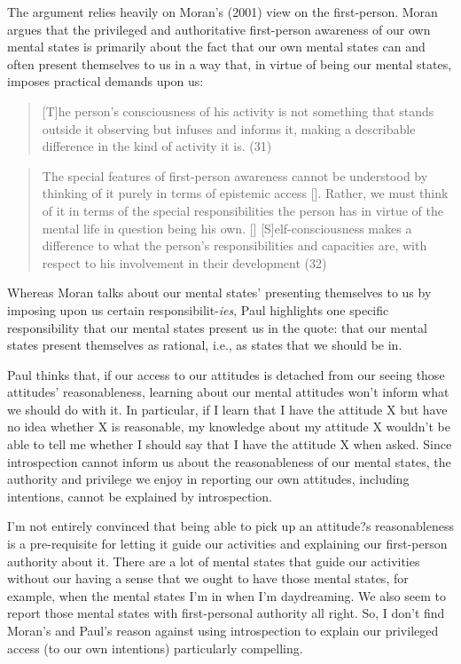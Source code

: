 \documentclass[a4paper,12pt]{article}
\begin{document}
The argument relies heavily on Moran's (2001) view on the first-person. Moran argues that the privileged and authoritative first-person awareness of our own mental states is primarily about the fact that our own mental states can and often present themselves to us in a way that, in virtue of being our mental states, imposes practical demands upon us:

\begin{quote} [T]he person's consciousness of his activity is not something that stands outside it observing but infuses and informs it, making a describable difference in the kind of activity it is. (31) \end{quote}

\begin{quote} The special features of first-person awareness cannot be understood by thinking of it purely in terms of epistemic access [\textellipsis]. Rather, we must think of it in terms of the special responsibilities the person has in virtue of the mental life in question being his own. [\textellipsis] [S]elf-consciousness makes a difference to what the person's responsibilities and capacities are, with respect to his involvement in their development (32) \end{quote}

Whereas Moran talks about our mental states' presenting themselves to us by imposing upon us certain responsibilit-\emph{ies}, Paul highlights one specific responsibility that our mental states present us in the quote: that our mental states present themselves as rational, i.e., as states that we should be in.

Paul thinks that, if our access to our attitudes is detached from our seeing those attitudes' reasonableness, learning about our mental attitudes won't inform what we should do with it. In particular, if I learn that I have the attitude X but have no idea whether X is reasonable, my knowledge about my attitude X wouldn't be able to tell me whether I should say that I have the attitude X when asked. Since introspection cannot inform us about the reasonableness of our mental states, the authority and privilege we enjoy in reporting our own attitudes, including intentions, cannot be explained by introspection.

I'm not entirely convinced that being able to pick up an attitude?s reasonableness is a pre-requisite for letting it guide our activities and explaining our first-person authority about it. There are a lot of mental states that guide our activities without our having a sense that we ought to have those mental states, for example, when the mental states I'm in when I'm daydreaming. We also seem to report those mental states with first-personal authority all right. So, I don't find Moran's and Paul's reason against using introspection to explain our privileged access (to our own intentions) particularly compelling.
\end{document}
